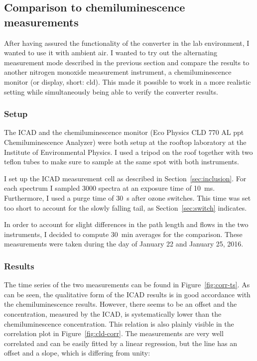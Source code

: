 \subsection{Comparison to chemiluminescence measurements}
\label{sec:cld}

After having assured the functionality of the converter in the lab
environment, I wanted to use it with ambient air. I wanted to try out
the alternating measurement mode described in the previous section and
compare the results to another nitrogen monoxide measurement
instrument, a chemiluminescence monitor (or display, short: cld). This
made it possible to work in a more realistic setting while
simultaneously being able to verify the converter results.

\subsubsection{Setup}
\label{sec:cld-setup}

The  ICAD and the chemiluminescence monitor (Eco Physics CLD
770 AL ppt Chemiluminescence  Analyzer) were both setup at the
rooftop laboratory at the Institute of Environmental Physics. I used
a tripod on the roof together with two teflon tubes to make sure to
sample at the same spot with both instruments.

I set up the ICAD measurement cell as described in
Section~\ref{sec:inclusion}. For each spectrum I sampled 3000 spectra
at an exposure time of \SI{10}{\milli\second}. Furthermore, I used a
purge time of \SI{30}{\second} after ozone switches. This time was set
too short to account for the slowly falling tail, as
Section~\ref{sec:switch} indicates.

In order to account for slight differences in the path length and
flows in the two instruments, I decided to compute \SI{30}{\minute}
averages for the comparison. These measurements were taken during the
day of January 22 and January 25, 2016.

\subsubsection{Results}
\label{sec:cld-results}

The time series of the two measurements can be found in
Figure~\ref{fig:corr-ts}. As can be seen, the qualitative form of the
 ICAD results is in good accordance with the
chemiluminescence results.  However, there seems to be an offset and
the concentration, measured by the  ICAD, is systematically
lower than the chemiluminescence concentration. This relation is also
plainly visible in the correlation plot in
Figure~\ref{fig:cld-corr}. The measurements are very well correlated
and can be easily fitted by a linear regression, but the line has an
offset and a slope, which is differing from unity:


